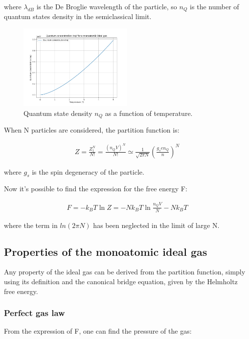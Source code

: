 \documentclass{article}
\begin{document}
where $\lambda_{dB}$ is the De Broglie wavelength of the particle, so $n_Q$ is the number of quantum states density in the semiclassical limit.

\begin{figure}[h]
    \centering
    \includegraphics[width=0.5\textwidth]{images/nq-monoatomic-ideal-gas.png}
    \caption{Quantum state density $n_Q$ as a function of temperature.}
    \label{fig:nq}
\end{figure}

When N particles are considered, the partition function is:

\begin{align*}
    Z=\frac{Z_1^N}{N!}=\frac{(n_QV)^N}{N!}\simeq \frac{1}{\sqrt{2\pi N}}\left(\frac{g_sen_Q}{n}\right)^N
\end{align*}

where $g_s$ is the spin degeneracy of the particle.

Now it's possible to find the expression for the free energy F:

\begin{align*}
    F=-k_BT\ln{Z}=-Nk_BT\ln{\frac{n_QV}{N}}-Nk_BT
\end{align*}

where the term in $ln(2\pi N)$ has been neglected in the limit of large N.


\subsection{Properties of the monoatomic ideal gas}

Any property of the ideal gas can be derived from the partition function,
simply using its definition and the canonical bridge equation, given by the Helmholtz free energy.

\subsubsection{Perfect gas law}

From the expression of F, one can find the pressure of the gas:
\end{document}
